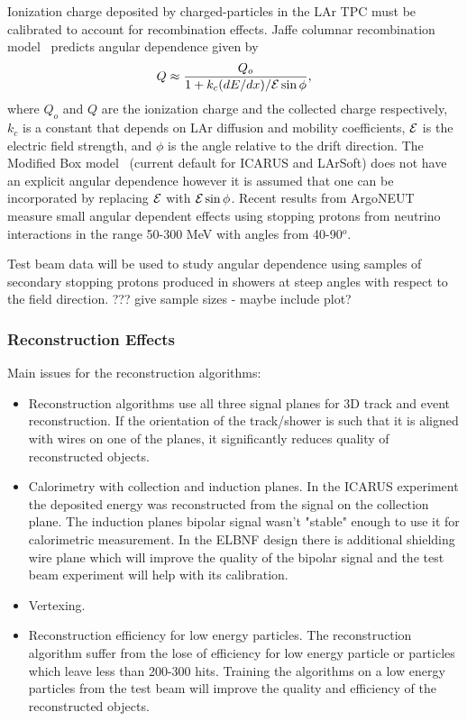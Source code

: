 Ionization charge deposited by charged-particles in the LAr TPC must be calibrated to
account for recombination effects. Jaffe columnar recombination model~\cite{jaffe,eqref} predicts 
angular dependence given by 
$$Q \approx \frac{Q_o}{1+k_c (dE/dx) / {\cal E} \sin\phi}, $$ 
where
$Q_o$ and $Q$ are the ionization charge and the collected charge respectively, 
$k_c$ is a constant that depends on LAr diffusion and mobility coefficients, $\cal E$ 
is the electric field strength, and $\phi$ is the angle relative to the drift direction.
%
The Modified Box model~\cite{box} (current default for ICARUS and LArSoft) does not have an
explicit angular dependence however it is assumed that one can be incorporated  
by replacing ${\cal E}$  with ${\cal E} \sin\phi$.
Recent results from ArgoNEUT~\cite{argoneut_rec} measure small angular dependent effects using 
stopping protons from neutrino interactions in the range 50-300 MeV with angles from 40-90$^o$.

Test beam data will be used to study angular dependence using 
samples of secondary stopping protons produced in showers at steep angles with
respect to the field direction.
??? give sample sizes - maybe include plot?

\subsubsection{Reconstruction Effects}



Main issues for the reconstruction algorithms:
\begin{itemize}
\item Reconstruction algorithms use all three signal planes for 3D track and event reconstruction. 
If the orientation of the track/shower is such that it is aligned with wires on one of the planes, it significantly reduces quality of reconstructed objects. 
\item Calorimetry with collection and induction planes. In the ICARUS experiment the deposited energy was reconstructed from the signal on the collection plane. The induction planes bipolar signal wasn't "stable" enough to use it for calorimetric measurement. In the ELBNF design there is additional shielding  wire plane which will improve the quality of the bipolar signal and the  test beam experiment will help with its calibration.
\item   Vertexing.
\item Reconstruction efficiency for low energy particles. The reconstruction algorithm suffer from the lose of efficiency for low energy particle or particles which leave less than 200-300 hits. Training the algorithms on a low energy particles from the test beam will improve the quality and efficiency of the reconstructed objects.
\end{itemize}


